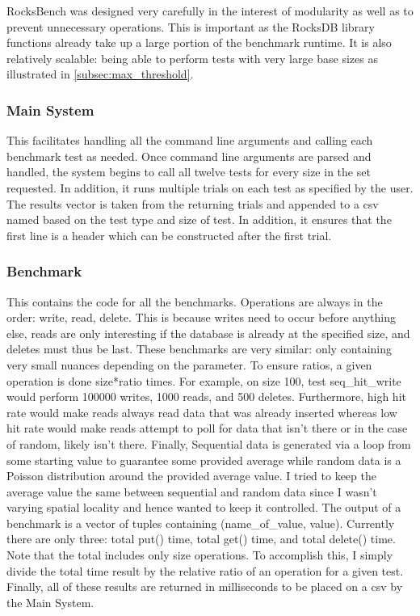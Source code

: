 \documentclass[twocolumn,11pt]{article}
\begin{document}
RocksBench was designed very carefully in the interest of modularity as well as
to prevent unnecessary operations. This is important as the RocksDB library
functions already take up a large portion of the benchmark runtime. It is also
relatively scalable: being able to perform tests with very large base sizes as
illustrated in \ref{subsec:max_threshold}.

\subsubsection{Main System}

This facilitates handling all the command line arguments and calling each
benchmark test as needed. Once command line arguments are parsed and handled,
the system begins to call all twelve tests for every size in the set requested.
In addition, it runs multiple trials on each test as specified by the user. The
results vector is taken from the returning trials and appended to a csv named
based on the test type and size of test. In addition, it ensures that the first
line is a header which can be constructed after the first trial.

\subsubsection{Benchmark}

This contains the code for all the benchmarks. Operations are always in the
order: write, read, delete. This is because writes need to occur before anything
else, reads are only interesting if the database is already at the specified
size, and deletes must thus be last. These benchmarks are very similar: only
containing very small nuances depending on the parameter. To ensure ratios, a
given operation is done size*ratio times. For example, on size 100, test
seq\_hit\_write would perform 100000 writes, 1000 reads, and 500 deletes.
Furthermore, high hit rate would make reads always read data that was already
inserted whereas low hit rate would make reads attempt to poll for data that
isn't there or in the case of random, likely isn't there. Finally, Sequential
data is generated via a loop from some starting value to guarantee some provided
average while random data is a Poisson distribution around the provided average
value. I tried to keep the average value the same between sequential and random
data since I wasn't varying spatial locality and hence wanted to keep it
controlled. The output of a benchmark is a vector of tuples containing
(name\_of\_value, value). Currently there are only three: total put() time,
total get() time, and total delete() time. Note that the total includes only
size operations. To accomplish this, I simply divide the total time result by
the relative ratio of an operation for a given test. Finally, all of these
results are returned in milliseconds to be placed on a csv by the Main System.
\end{document}
